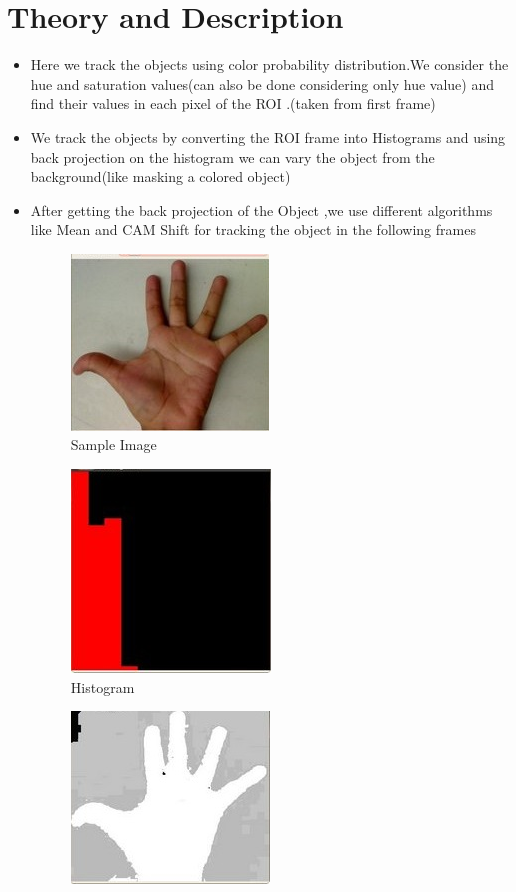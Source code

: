 \documentclass[11pt,a4paper]{article}
\begin{document}
	\section{Theory and Description}
	\begin{itemize}
		\item Here we track the objects using color probability distribution.We consider the hue and saturation values(can also be done considering only hue value) and find their values in each pixel of the ROI .(taken from first frame)
		\item We track the objects by converting the ROI frame into Histograms and using back projection on the histogram we can vary the object from the background(like masking a colored object)
		\item After getting the back projection of the Object ,we use different algorithms like Mean and CAM Shift for tracking the object in the following frames
		\begin{figure}[h!]
			\includegraphics[scale=0.5 ]{original.jpg}
			\centering
			\caption{Sample Image}
		\end{figure}
		\begin{figure}[h!]
			\includegraphics[scale=0.5 ]{Histogram.jpg}
			\centering
			\caption{Histogram}
		\end{figure}
		\begin{figure}[h!]
			\includegraphics[scale=0.5 ]{BackProjection.jpg}

\end{figure}
\end{itemize}
\end{document}
